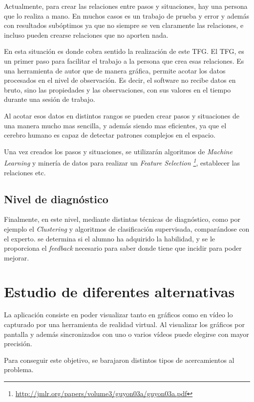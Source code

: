 Actualmente, para crear las relaciones entre pasos y situaciones, hay una persona que lo realiza a mano. En muchos casos
es un trabajo de prueba y error y adem\'as con resultados sub\'optimos ya que no siempre se ven claramente las relaciones,
e incluso pueden crearse relaciones que no aporten nada.

En esta situaci\'on es donde cobra sentido la realizaci\'on de este TFG. El TFG, es un primer paso para facilitar
el trabajo a la persona que crea esas relaciones. Es una herramienta de autor que de manera gr\'afica, permite
acotar los datos procesados en el nivel de observaci\'on. Es decir, el software no recibe datos en bruto, sino
las propiedades y las observaciones, con sus valores en el tiempo durante una sesi\'on de trabajo.

Al acotar esos datos en distintos rangos se pueden crear pasos y situaciones de una manera mucho mas sencilla, y adem\'as
siendo mas eficientes, ya que el cerebro humano es capaz de detectar patrones complejos en el espacio.

Una vez creados los pasos y situaciones, se utilizar\'an algoritmos de \emph{Machine Learning} y miner\'ia de datos para
realizar un \emph{Feature Selection \footnote{\url{http://jmlr.org/papers/volume3/guyon03a/guyon03a.pdf}}},
establecer las relaciones etc.

\subsection{Nivel de diagn\'ostico}
Finalmente, en este nivel, mediante distintas t\'ecnicas de diagn\'ostico, como por ejemplo el \emph{Clustering} y
algoritmos de clasificaci\'on supervisada, compar\'andose con el experto.
se determina si el alumno ha adquirido la habilidad, y se le proporciona el \emph{feedback} 
necesario para saber donde tiene que incidir para poder mejorar.

\section{Estudio de diferentes alternativas}
La aplicaci\'on consiste en poder visualizar tanto en gr\'aficos como en v\'ideo lo capturado por una herramienta
de realidad virtual. Al visualizar los gr\'aficos por pantalla y adem\'as sincronizados con uno o varios v\'ideos 
puede elegirse con mayor precisi\'on.

Para conseguir este objetivo, se barajaron distintos tipos de acercamientos al problema.


